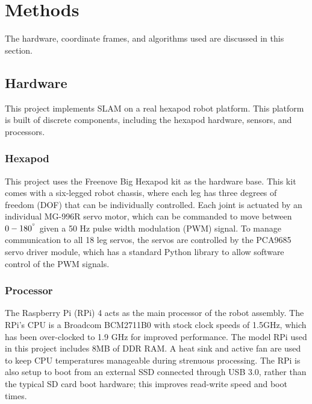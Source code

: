 \section{ Methods }

The hardware, coordinate frames, and algorithms used are discussed in this section.

\subsection{ Hardware }

 This project implements SLAM on a real hexapod robot platform. This platform is built of discrete components, including the hexapod hardware, sensors, and processors.

\subsubsection{ Hexapod }

This project uses the Freenove Big Hexapod kit as the hardware base. This kit comes with a six-legged robot chassis, where each leg has three degrees of freedom (DOF) that can be individually controlled. Each joint is actuated by an individual MG-996R servo motor, which can be commanded to move between $0-180^{\degree}$ given a 50 Hz pulse width modulation (PWM) signal. To manage communication to all 18 leg servos, the servos are controlled by the PCA9685 servo driver module, which has a standard Python library to allow software control of the PWM signals.

\subsubsection{ Processor }
The Raspberry Pi (RPi) 4 acts as the main processor of the robot assembly.  The RPi's CPU is a Broadcom BCM2711B0 with stock clock speeds of 1.5GHz, which has been over-clocked to 1.9 GHz for improved performance.  The model RPi used in this project includes 8MB of DDR RAM. A heat sink and active fan are used to keep CPU temperatures manageable during strenuous processing. The RPi is also setup to boot from an external SSD connected through USB 3.0, rather than the typical SD card boot hardware; this improves read-write speed and boot times.

